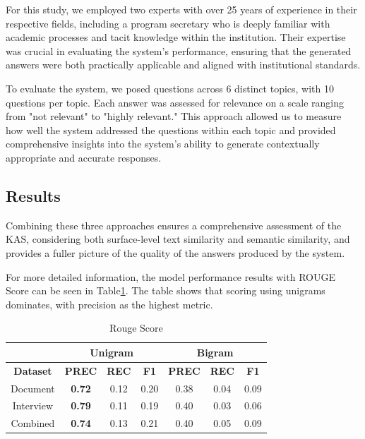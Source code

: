 \documentclass[runningheads]{llncs}
\begin{document}
For this study, we employed two experts with over 25 years of experience in their respective fields, including a program secretary who is deeply familiar with academic processes and tacit knowledge within the institution. Their expertise was crucial in evaluating the system’s performance, ensuring that the generated answers were both practically applicable and aligned with institutional standards.

To evaluate the system, we posed questions across 6 distinct topics, with 10 questions per topic. Each answer was assessed for relevance on a scale ranging from "not relevant" to "highly relevant." This approach allowed us to measure how well the system addressed the questions within each topic and provided comprehensive insights into the system’s ability to generate contextually appropriate and accurate responses.

\subsection{Results}
Combining these three approaches ensures a comprehensive assessment of the KAS, considering both surface-level text similarity and semantic similarity, and provides a fuller picture of the quality of the answers produced by the system.

For more detailed information, the model performance results with ROUGE Score can be seen in Table\ref{tab:rouge-table}. The table shows that scoring using unigrams dominates, with precision as the highest metric.

\begin{table}[htbp]
    \centering
    \caption{Rouge Score}
    \setlength{\arrayrulewidth}{0.5pt} %
    \renewcommand{\arraystretch}{1.5} %
    \begin{tabular}{|c|c|c|c|c|c|c|}
        \cline{2-7}
        \multicolumn{1}{c|}{} & \multicolumn{3}{c|}{\textbf{Unigram}} & \multicolumn{3}{c|}{\textbf{Bigram}} \\ 
        \hline
        \textbf{Dataset} & \textbf{PREC} & \textbf{REC} & \textbf{F1} & \textbf{PREC} & \textbf{REC} & \textbf{F1} \\
        \hline
        Document & \textbf{0.72} & 0.12 & 0.20 & 0.38 & 0.04 & 0.09 \\ 
        \hline
        Interview & \textbf{0.79} & 0.11 & 0.19 & 0.40 & 0.03 & 0.06 \\ 
        \hline
        Combined & \textbf{0.74} & 0.13 & 0.21 & 0.40 & 0.05 & 0.09 \\ 
        \hline
    \end{tabular}
    \label{tab:rouge-table}
\end{table}
\end{document}
